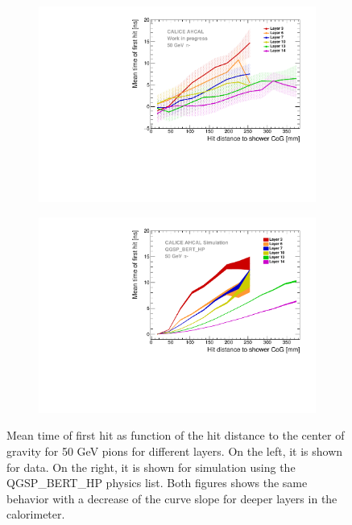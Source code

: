 \begin{figure}[htbp!]
	\begin{subfigure}[t]{0.5\textwidth}
		\centering
		\includegraphics[width=1\textwidth]{../Thesis_Plots/Timing/Pions/Plots/Timing_Radius_Comparison_ShortAsymRange_IndividualLayers.pdf}
		\caption{}\label{fig:Radius_Indivi}
	\end{subfigure}
	\hfill
	\begin{subfigure}[t]{0.5\textwidth}
		\centering
		\includegraphics[width=1\textwidth]{../Thesis_Plots/Timing/Pions/Plots/Timing_Radius_Comparison_ShortAsymRange_IndividualLayers_Sim.pdf}
		\caption{}\label{fig:Radius_Indivi_Sim}
	\end{subfigure}
	\caption{Mean time of first hit as function of the hit distance to the center of gravity for 50 GeV pions for different layers. On the left, it is shown for data. On the right, it is shown for simulation using the QGSP\_BERT\_HP physics list. Both figures shows the same behavior with a decrease of the curve slope for deeper layers in the calorimeter.}
	\label{fig:Radius_IndiviAll}
\end{figure}


